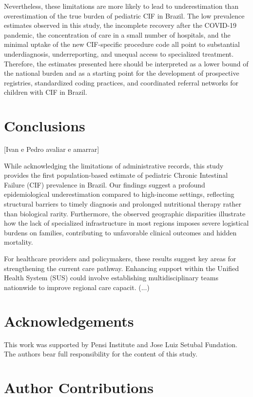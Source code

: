 \documentclass[pdflatex,sn-mathphys-num]{sn-jnl}
\theoremstyle{thmstyleone}%
\theoremstyle{thmstyletwo}%
\theoremstyle{thmstylethree}%
\begin{document}
Nevertheless, these limitations are more likely to lead to underestimation than overestimation of the true burden of pediatric CIF in Brazil. The low prevalence estimates observed in this study, the incomplete recovery after the COVID-19 pandemic, the concentration of care in a small number of hospitals, and the minimal uptake of the new CIF-specific procedure code all point to substantial underdiagnosis, underreporting, and unequal access to specialized treatment. Therefore, the estimates presented here should be interpreted as a lower bound of the national burden and as a starting point for the development of prospective registries, standardized coding practices, and coordinated referral networks for children with CIF in Brazil.


\section{Conclusions}\label{sec5}

[Ivan e Pedro avaliar e amarrar]

While acknowledging the limitations of administrative records, this study provides the first population-based estimate of pediatric Chronic Intestinal Failure (CIF) prevalence in Brazil. Our findings suggest a profound epidemiological underestimation compared to high-income settings, reflecting structural barriers to timely diagnosis and prolonged nutritional therapy rather than biological rarity. Furthermore, the observed geographic disparities illustrate how the lack of specialized infrastructure in most regions imposes severe logistical burdens on families, contributing to unfavorable clinical outcomes and hidden mortality.

For healthcare providers and policymakers, these results suggest key areas for strengthening the current care pathway. Enhancing support within the Unified Health System (SUS) could involve establishing multidisciplinary teams nationwide to improve regional care capacit. (...)


\section*{Acknowledgements}

This work was supported by Pensi Institute and Jose Luiz Setubal Fundation. The authors bear full responsibility for the content of this study. 

\section*{Author Contributions} 
\end{document}
